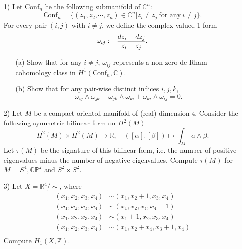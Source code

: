 \documentclass[10pt]{article}
\begin{document}
\begin{enumerate}
\item [1)]  Let $\text{Conf}_n$ be the following submanifold of $\mathbb C^n$:
$$
\text{Conf}_n=\{(z_1,z_2, \cdots, z_n)\in \mathbb C^n| z_i\neq z_j \ \text{for any}\  i\neq j\}.
$$
For every pair $(i,j)$ with $i\neq j$, we define the complex valued 1-form
$$
\omega_{ij}:= {dz_i-dz_j\over z_i-z_j}.
$$
\begin{enumerate}
\item [(a)] Show that for any $i\neq j$, $\omega_{ij}$ represents a non-zero de Rham cohomology class in $H^1(\text{Conf}_n, \mathbb C)$.

\item [(b)] Show that for any pair-wise distinct indices $i,j,k$,
$$
  \omega_{ij}\wedge \omega_{jk}+\omega_{jk}\wedge \omega_{ki}+\omega_{ki}\wedge \omega_{ij}=0.
$$
\end{enumerate}





\item [2)] Let $M$ be a compact oriented manifold of (real) dimension $4$. Consider the following symmetric bilinear form on  $H^2(M)$
$$H^2(M)\times H^2(M)\to\mathbb{R},\quad ([\alpha],[\beta])\mapsto\int_M\alpha\wedge\beta.
$$
Let $\tau(M)$ be the signature of this bilinear form, i.e. the number of positive eigenvalues minus the number of negative eigenvalues. Compute $\tau(M)$ for $M=S^4, \mathbb{CP}^2$ and $S^2\times S^2$.

\item [3)] Let $X=\mathbb{R}^4/\sim$, where
      \begin{align*}
         (x_1,x_2,x_3,x_4)&\sim (x_1,x_2+1,x_3,x_4)\\
         (x_1,x_2,x_3,x_4)&\sim (x_1,x_2,x_3,x_4+1)\\
         (x_1,x_2,x_3,x_4)&\sim (x_1+1,x_2,x_3,x_4)\\
         (x_1,x_2,x_3,x_4)&\sim (x_1,x_2+x_4,x_3+1,x_4)\\
      \end{align*} Compute $H_1(X, \mathbb Z)$.



\end{enumerate}
\end{document}
